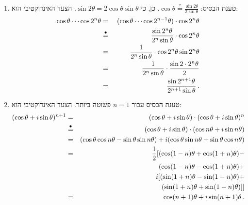 \begin{enumerate}
\item 
טענת הבסיס:
$\cos \theta \stackrel{?}{=} \frac{\sin 2\theta}{2\sin \theta}$.
כן, כי
$\sin 2\theta = 2\cos\theta\sin\theta$.
הצעד האינדוקטיבי הוא:
\begin{eqnarray*}
\cos\theta\cdots \cos 2^{n}\theta &=& (\cos\theta\cdots \cos 2^{n-1}\theta) \cdot \cos 2^{n}\theta\\
&\stackrel{\bullet}{=}{}&\frac{\sin 2^{n}\theta}{2^{n}\sin \theta}\cdot \cos 2^{n}\theta\\
&=& \frac{1}{2^{n}\sin \theta} \cdot \cos 2^n\theta\sin 2^{n}\theta\\
&=& \frac{1}{2^{n}\sin \theta} \cdot \frac{\sin 2\cdot 2^{n}\theta}{2}\\
&=&\frac{\sin 2^{n+1}\theta}{2^{n+1}\sin \theta}\,.
\end{eqnarray*}
\item
טענת הבסיס עבור
$n=1$
פשוטה ביותר. הצעד האינדוקטיבי הוא:
\begin{eqnarray*}
(\cos \theta + i\sin\theta)^{n+1} &=& (\cos \theta + i\sin \theta)\cdot (\cos \theta + i\sin \theta)^n\\
&\stackrel{\bullet}{=}& (\cos \theta + i\sin \theta)\cdot (\cos n\theta + i\sin n\theta)\\
&=& (\cos\theta \cos n\theta - \sin \theta \sin n\theta) + i (\cos \theta \sin n\theta + \sin\theta \cos n\theta)\\
&=& \frac{1}{2} [(\cos (1-n)\theta + \cos (1+n)\theta) -\\
&&\;\;\;\;(\cos(1-n)\theta - \cos (1+n)\theta) +\\
&& \;\;i[(\sin (1+n)\theta - \sin (1-n)\theta) +\\
&&\;\;\;\;(\sin(1+n)\theta + \sin (1-n)\theta)]]\\
&=& \cos (n+1)\theta + i\sin (n+1)\theta\,.
\end{eqnarray*}

\vspace*{-6ex}


\end{enumerate}
